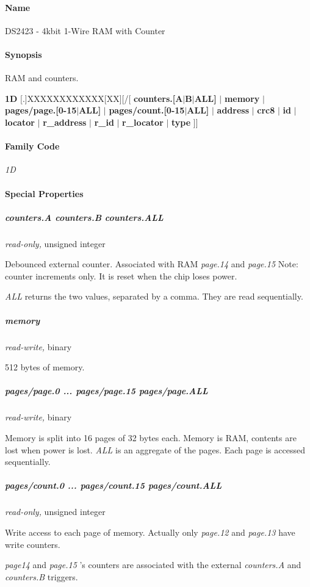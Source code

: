 \paragraph*{Name}
DS2423 - 4kbit 1-Wire RAM with Counter 
\paragraph*{Synopsis}
RAM and counters.


\textbf{1D} [.]XXXXXXXXXXXX[XX][/[ \textbf{counters.[A$|$B$|$ALL]} $|$ \textbf{memory} $|$ \textbf{pages/page.[0-15$|$ALL]} $|$ \textbf{pages/count.[0-15$|$ALL]}
$|$           \textbf{address} $|$ \textbf{crc8} $|$ \textbf{id} $|$ \textbf{locator} $|$ \textbf{r\_address} $|$ \textbf{r\_id} $|$ \textbf{r\_locator} $|$ \textbf{type}
 ]] 
\paragraph*{Family Code}


\textit{1D} 
\paragraph*{Special Properties}

\subparagraph*{counters.A counters.B counters.ALL}\textit{read-only,}
unsigned integer 

Debounced external counter. Associated with RAM \textit{page.14} and \textit{page.15} Note:
counter increments only. It is reset when the chip loses power. 

\textit{ALL} returns the two values, separated by a comma. They are read sequentially.

\subparagraph*{memory}\textit{read-write,} binary 

512 bytes of memory. 
\subparagraph*{pages/page.0 ... pages/page.15 pages/page.ALL}\textit{read-write,} binary


Memory is split into 16 pages of 32 bytes each. Memory is RAM, contents
are lost when power is lost. \textit{ALL} is an aggregate of the pages. Each page
is accessed sequentially. 
\subparagraph*{pages/count.0 ... pages/count.15 pages/count.ALL}\textit{read-only,}
unsigned integer 

 Write access to each page of memory. Actually only \textit{page.12} and \textit{page.13} have
write counters. 

\textit{page14} and \textit{page.15} 's counters are associated with the external \textit{counters.A}
and \textit{counters.B} triggers. 

